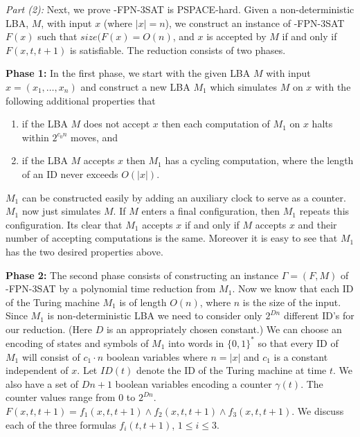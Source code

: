 \smallskip

\noindent
{\em Part (2):}
Next, we prove {-FPN-3SAT} is {\sf PSPACE}-hard. 
Given a non-deterministic {\sf LBA},
$M$, with input $x$ (where $|x| = n$), 
we construct an instance of {-FPN-3SAT} $F(x)$ such that
$size(F(x)=  O(n)$,
and $x$ is accepted by $M$ if and only if $F(x,t,t+1)$ is satisfiable.
The reduction consists of two phases. 

\noindent
{\bf Phase 1:}
In the first phase, we
start with the given {\sf LBA} $M$ with input 
$x = (x_1, \ldots, x_n)$ and construct
a new {\sf LBA} $M_1$ which simulates $M$ on $x$ with the
following additional properties that
\begin{enumerate}
\item
if the {\sf LBA} $M$ does not accept $x$ then
each computation of $M_1$ on $x$ halts within $2^{c_0n}$ moves, and 
\item
if the {\sf LBA} $M$ accepts $x$ then $M_1$ has a cycling computation,
where the length of an ID never exceeds $O(|x|)$.

\end{enumerate}



$M_1$ can be constructed easily by adding an auxiliary  clock to serve 
as a counter. $M_1$ now just simulates $M$.  
If $M$ enters a final configuration, then $M_1$ repeats this
configuration. Its clear that 
$M_1$ accepts $x$
if and only if $M$ accepts $x$ and their number of
accepting computations is the same. Moreover it is easy to see that
$M_1$ has the two desired properties above.



\noindent
{\bf Phase 2:}
The second phase consists of constructing an instance 
$\Gamma = (F, M)$ of 
{-FPN-3SAT} by a polynomial time reduction from $M_1$. 
Now we know that each ID of the Turing machine $M_1$ is 
of length $O(n)$, where $n$ is the size of the input.
Since $M_1$ is non-deterministic {\sf LBA}
we need to consider only $2^{Dn}$ different ID's for
our reduction. (Here $D$ is an appropriately chosen constant.)  
We can choose
an encoding of states and symbols of $M_1$ into words in $\{0,1\}^*$ so
that every ID of $M_1$ will consist of $c_1 \cdot n$ boolean variables where
$n=|x|$ and $c_1$ is a constant independent of $x$. Let $ID(t)$ denote
the {\sf ID} of the Turing machine at time $t$. We also have 
a set of $Dn+1$ boolean variables encoding a counter $\gamma(t)$. The counter
values range from $0$ to $2^{Dn}$. 
$F(x, t,t+1) = f_1(x,t,t+1) \wedge f_2(x,t,t+1) \wedge f_3(x, t, t+1)$. 
We discuss each of the three formulas $f_i(t,t+1)$, $1 \leq i \leq 3$.


